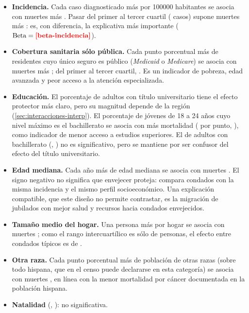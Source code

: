 \begin{itemize}
  \item \textbf{Incidencia.} Cada caso diagnosticado más por \num{100000} habitantes se asocia con
   muertes más . Pasar del primer al tercer cuartil
  ( casos) supone  muertes más :
  es, con diferencia, la explicativa más importante ($\text{Beta}=\res{beta-incidencia}$).
  \item \textbf{Cobertura sanitaria sólo pública.} Cada punto porcentual más de residentes cuyo
  único seguro es público (\emph{Medicaid} o \emph{Medicare}) se asocia con 
  muertes más ; del primer al tercer cuartil, 
  . Es un indicador de pobreza, edad avanzada y peor acceso a la atención
  especializada.
  \item \textbf{Educación.} El porcentaje de adultos con título universitario tiene el efecto
  protector más claro, pero su magnitud depende de la región (\cref{sec:interacciones-interp}). El
  porcentaje de jóvenes de 18 a 24 años cuyo nivel máximo es el bachillerato se asocia con más
  mortalidad ( por punto, ), como indicador de menor acceso a
  estudios superiores. El de adultos con bachillerato (, ) no es
  significativo, pero se mantiene por ser confusor del efecto del título universitario.
  \item \textbf{Edad mediana.} Cada año más de edad mediana se asocia con  muertes
  . El signo negativo no significa que envejecer proteja: compara condados con la
  misma incidencia y el mismo perfil socioeconómico. Una explicación compatible, que este diseño no
  permite contrastar, es la migración de jubilados con mejor salud y recursos hacia condados
  envejecidos.
  \item \textbf{Tamaño medio del hogar.} Una persona más por hogar se asocia con 
  muertes ; como el rango intercuartílico es sólo de  personas, el
  efecto entre condados típicos es de  .
  \item \textbf{Otra raza.} Cada punto porcentual más de población de otras razas (sobre todo
  hispana, que en el censo puede declararse en esta categoría) se asocia con 
  muertes , en línea con la menor mortalidad por cáncer documentada en la población
  hispana.
  \item \textbf{Natalidad} (, ): no significativa.
\end{itemize}

